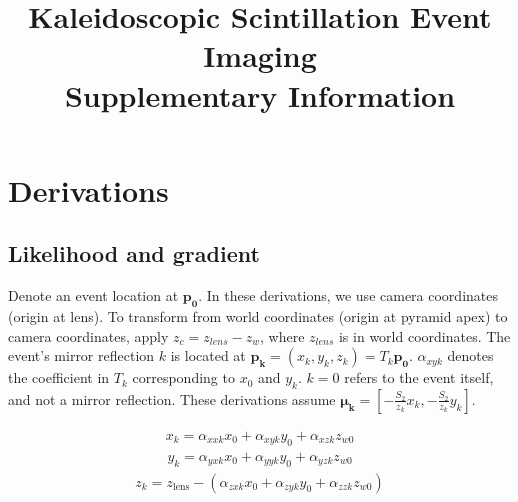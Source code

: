 \documentclass{article}
\begin{document}
\title{Kaleidoscopic Scintillation Event Imaging \\
\large Supplementary Information}

\author{}



\date{}

\maketitle

\section{Derivations}
\subsection{Likelihood and gradient} \label{sec:like}

Denote an event location at $\bm{p_0}$.
In these derivations, we use camera coordinates (origin at lens). 
To transform from world coordinates (origin at pyramid apex) to camera 
coordinates, apply $z_c = z_{lens} - z_w$, where $z_{lens}$ is in world coordinates.
The event's mirror reflection $k$ is located at $\bm{p_k}=(x_k,y_k,z_k)=T_k\bm{p_0}$.
$\alpha_{xyk}$ denotes the coefficient in $T_k$ corresponding to $x_0$ and $y_k$.
$k=0$ refers to the event itself, and not a mirror reflection.
These derivations assume $\bm{\mu_k} = \left[-\frac{S_2}{z_k} x_k, -\frac{S_2}{z_k} y_k\right]$. 

\begin{align}
x_k = \alpha_{xxk}x_0 + \alpha_{xyk}y_0 + \alpha_{xzk}z_{w0}
\end{align}
\begin{align}
y_k = \alpha_{yxk}x_0 + \alpha_{yyk}y_0 + \alpha_{yzk}z_{w0}
\end{align}
\begin{align}
z_k = z_\text{lens} - (\alpha_{zxk}x_0 + \alpha_{zyk}y_0 + \alpha_{zzk}z_{w0})
\end{align}
\end{document}
